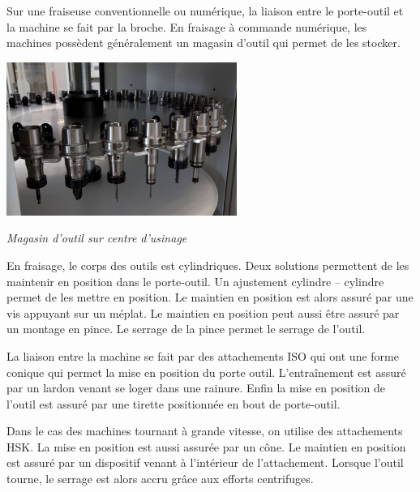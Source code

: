 \documentclass[11pt,oneside]{article}
\begin{document}
Sur une fraiseuse conventionnelle ou numérique, la liaison entre le porte-outil et la machine se fait par la broche. En fraisage à commande numérique, les machines possèdent généralement un magasin d'outil qui permet de les stocker. 

\begin{center}
\includegraphics[height=5cm]{png/magasin_outil}

\textit{Magasin d'outil sur centre d'usinage}
\end{center}


En fraisage, le corps des outils est cylindriques. Deux solutions permettent de les maintenir en position dans le porte-outil. Un ajustement cylindre -- cylindre permet de les mettre en position. Le maintien en position est alors assuré par une vis appuyant sur un méplat. Le maintien en position peut aussi être assuré par un montage en pince. Le serrage de la pince permet le serrage de l'outil. 

La liaison entre la machine se fait par des attachements ISO qui ont une forme conique qui permet la mise en position du porte outil. L'entraînement est assuré par un lardon venant se loger dans une rainure. Enfin la mise en position de l'outil est assuré par une tirette positionnée en bout de porte-outil. 

Dans le cas des machines tournant à grande vitesse, on utilise des attachements HSK. La mise en position est aussi assurée par un cône. Le maintien en position est assuré par un dispositif venant à l'intérieur de l'attachement. Lorsque l'outil tourne, le serrage est alors accru grâce aux efforts centrifuges. 
\end{document}
